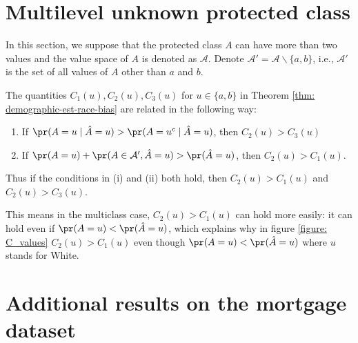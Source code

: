 \begin{appendices}



\section{Multilevel unknown protected class}
In this section, we suppose that the protected class $A$ can have more than two values and the value space of $A$ is denoted as $\mathcal{A}$. Denote $\mathcal{A}' = \mathcal{A}\backslash\{a, b\}$, i.e., $\mathcal{A}'$ is the set of all values of $A$ other than $a$ and $b$.


\begin{corollary} \label{corollary: C-functions-multiclass}
The quantities $C_1(u), C_2(u), C_3(u)$ for $u \in \{a, b\}$ in Theorem \ref{thm: demographic-est-race-bias} are related in the following way:
\begin{enumerate}[label=(\roman*)]
    \item If $\pr (A = u \mid \hat{A} = u) > \pr (A = u^c \mid \hat{A} = u)$, then $C_2(u) > C_3(u)$
    \item If $\pr (A = u) + \pr (A \in \mathcal{A}', \hat{A} = u)> \pr (\hat{A} = u)$, then $C_2(u) > C_1(u)$.
\end{enumerate}
Thus if the conditions in (i) and (ii) both hold, then $C_2(u) > C_1(u)$ and $C_2(u) > C_3(u)$.
\end{corollary}

This means in the multiclass case, $C_2(u) > C_1(u)$ can hold more easily: it can hold even if $\pr (A = u) < \pr (\hat{A} = u)$, which explains why in figure \ref{figure: C_values} $C_2(u) > C_1(u)$ even though $\pr (A = u) < \pr (\hat{A} = u)$ where $u$ stands for White.  



\section{Additional results on the mortgage dataset}

\end{appendices}
